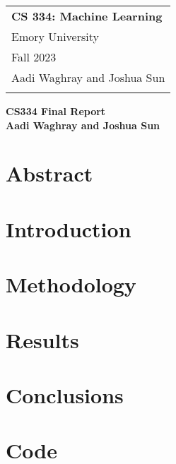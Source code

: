 \documentclass[12pt]{article}
\begin{document}
\thispagestyle{empty}

\begin{tabular}{p{10.5cm}}
    {\large \bf CS 334: Machine Learning} \\
    Emory University                      \\ Fall 2023  \\ Aadi Waghray and Joshua Sun\\
    \bottomrule
    \\
\end{tabular}

\vspace*{0.3cm}

\begin{center}
    {\Large \bf CS334 Final Report }\\ %
    \vspace*{0.02cm}
    {\bf Aadi Waghray and Joshua Sun}
\end{center}

\vspace{0.4cm}
\section*{Abstract}

\section*{Introduction}

\section*{Methodology}

\section*{Results}

\section*{Conclusions}

\section*{Code}

\newpage
\printbibliography
\end{document}

